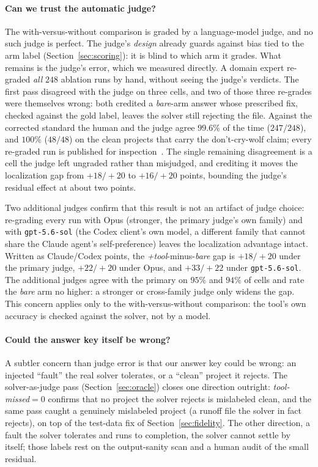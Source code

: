 \documentclass[conference]{IEEEtran}
\begin{document}
\paragraph{Can we trust the automatic judge?} The with-versus-without comparison is graded by a
language-model judge, and no such judge is perfect. The judge's \emph{design} already guards
against bias tied to the arm label (Section~\ref{sec:scoring}): it is blind to which arm it
grades. What remains is the judge's error, which we measured directly. A domain expert re-graded \emph{all} $248$ ablation runs by
hand, without seeing the judge's verdicts. The first pass disagreed with the judge on three cells, and two of those three re-grades were
themselves wrong: both credited a \emph{bare}-arm answer whose prescribed fix, checked against
the gold label, leaves the solver still rejecting the file. Against the
corrected standard the human and the judge agree $99.6\%$ of the time ($247/248$), and $100\%$
($48/48$) on the clean projects that carry the don't-cry-wolf claim; every re-graded run is
published for inspection~\cite{artifact-human}. The single remaining disagreement is a cell the
judge left ungraded rather than misjudged, and crediting it moves the localization gap from
$+18/{+}20$ to $+16/{+}20$ points, bounding the judge's residual effect at about two points.

Two additional judges confirm that this result is not an artifact
of judge choice: re-grading every run with Opus (stronger, the primary judge's own family) and
with \texttt{gpt-5.6-sol} (the Codex client's own model, a different family that cannot share
the Claude agent's self-preference) leaves the localization advantage intact. Written as Claude/Codex points, the
\emph{+tool}-minus-\emph{bare} gap is $+18/{+}20$ under the primary judge, $+22/{+}20$ under Opus,
and $+33/{+}22$ under \texttt{gpt-5.6-sol}. The additional judges agree with the primary on $95\%$
and $94\%$ of cells and rate the \emph{bare} arm no higher: a stronger or cross-family judge
only widens the gap. This concern applies only to the with-versus-without comparison: the tool's
own accuracy is checked against the solver, not by a model.

\paragraph{Could the answer key itself be wrong?} A subtler concern than judge error is that our
answer key could be wrong: an injected ``fault'' the real solver tolerates, or a ``clean''
project it rejects. The solver-as-judge pass (Section~\ref{sec:oracle}) closes one direction
outright: \emph{tool-missed}$=0$ confirms that no project the solver rejects is mislabeled clean,
and the same pass caught a genuinely mislabeled project (a runoff file the solver in fact
rejects), on top of the test-data fix of Section~\ref{sec:fidelity}. The other direction, a
fault the solver tolerates and runs to completion, the solver cannot settle by itself; those
labels rest on the output-sanity scan and a human audit of the small residual.
\end{document}
